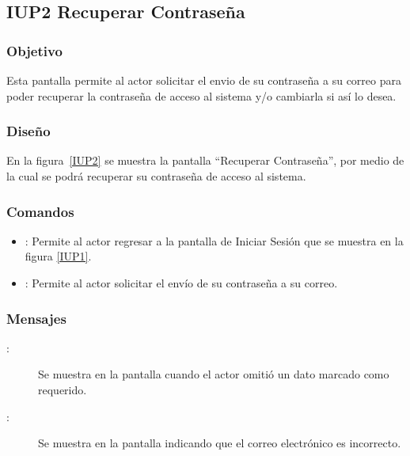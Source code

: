 \subsection{IUP2 Recuperar Contraseña}
 
\subsubsection{Objetivo}

    Esta pantalla permite al actor solicitar el envio de su contraseña a su correo para poder recuperar la contraseña de acceso al sistema y/o cambiarla si así lo desea.

\subsubsection{Diseño}

    En la figura~\ref{IUP2} se muestra la pantalla ``Recuperar Contraseña'', por medio de la cual se podrá recuperar su contraseña de acceso al sistema. \\
	\newpage

\subsubsection{Comandos}
\begin{itemize}
    \item {}: Permite al actor regresar a la pantalla de Iniciar Sesión que se muestra en la figura \ref{IUP1}.
    \item {}: Permite al actor solicitar el envío de su contraseña a su correo.
  
\end{itemize}

\subsubsection{Mensajes}

\begin{description}
    \item[:] Se muestra en la pantalla  cuando el actor omitió un dato marcado como requerido.
    \item[:] Se muestra en la pantalla  indicando que el correo electrónico es incorrecto.
\end{description}
